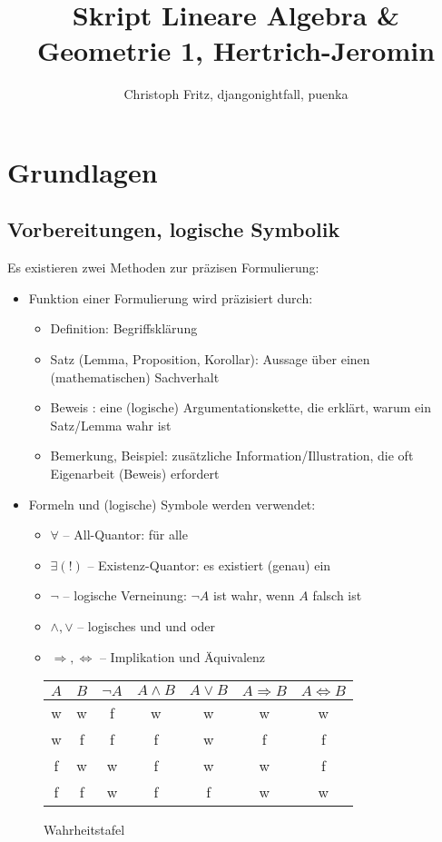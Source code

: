 \documentclass[12pt,a4paper,parskip=half-,DIV=15]{scrartcl}
\author{Christoph Fritz, djangonightfall, puenka}
\title{Skript Lineare Algebra \& Geometrie 1, Hertrich-Jeromin}
\begin{document}
\maketitle
\tableofcontents

\section{Grundlagen}

\subsection{Vorbereitungen, logische Symbolik}
Es existieren zwei Methoden zur präzisen Formulierung:
\begin{itemize}
\item Funktion einer Formulierung wird präzisiert durch: 
	\begin{itemize}
	\item Definition: Begriffsklärung
	\item Satz (Lemma, Proposition, Korollar): Aussage über einen (mathematischen) Sachverhalt
	\item Beweis : eine (logische) Argumentationskette, die erklärt, warum ein Satz/Lemma wahr ist
	\item Bemerkung, Beispiel: zusätzliche Information/Illustration, die oft Eigenarbeit (Beweis) erfordert
	\end{itemize}
\item Formeln und (logische) Symbole werden verwendet:
	\begin{itemize}
	\item $\forall$ -- All-Quantor: \glqq für alle\grqq
	\item $\exists(!)$ -- Existenz-Quantor: \glqq es existiert (genau) ein\grqq
	\item $\lnot$ -- logische Verneinung: $\lnot A$ ist wahr, wenn $A$ falsch ist
	\item $\land ,\lor$ -- logisches \glqq und\grqq{} und \glqq oder\grqq
	\item $\Rightarrow ,\Leftrightarrow$ -- Implikation und Äquivalenz
	\end{itemize}
\end{itemize}

\begin{figure}[H]\centering
\begin{tabular}{c|c|c|c|c|c|c}
$A$ & $B$ & $\lnot A$ & $A\land B$ &$A\lor B$&$A \Rightarrow B$ & $A\Leftrightarrow B$\\\hline
w & w & f & w & w & w & w\\
w & f & f & f & w & f & f\\
f & w & w & f & w & w & f\\
f & f & w & f & f & w & w\\
\end{tabular}
\caption{Wahrheitstafel}
\end{figure}
\end{document}
